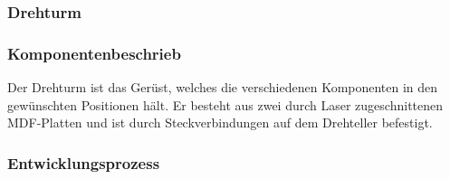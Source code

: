 \subsubsection{Drehturm}
\subsubsection*{Komponentenbeschrieb}

Der Drehturm ist das Gerüst, welches die verschiedenen Komponenten in den gewünschten Positionen hält. Er besteht aus zwei durch Laser zugeschnittenen MDF-Platten und ist durch Steckverbindungen auf dem Drehteller befestigt.

\subsubsection*{Entwicklungsprozess}